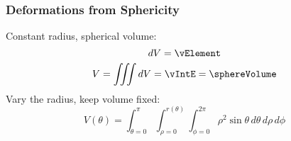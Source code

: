 %

\begin{frame}\frametitle{Deformations from Sphericity}
Constant radius, spherical volume:
%
\begin{equation}
	dV = \vElement
\end{equation}
%
\begin{equation}
	V = \iiint dV = \displaystyle\vIntE = \sphereVolume
\end{equation}
\pause
Vary the radius, keep volume fixed:
\begin{equation}
	V(\theta) = \int_{\theta=0}^{\pi} \int_{\rho = 0}^{r(\theta)} \int_{\phi=0}^{2\pi} \rho^{2} \sin{\theta}\, d\theta\, d\rho\, d\phi
\end{equation}
\end{frame}

